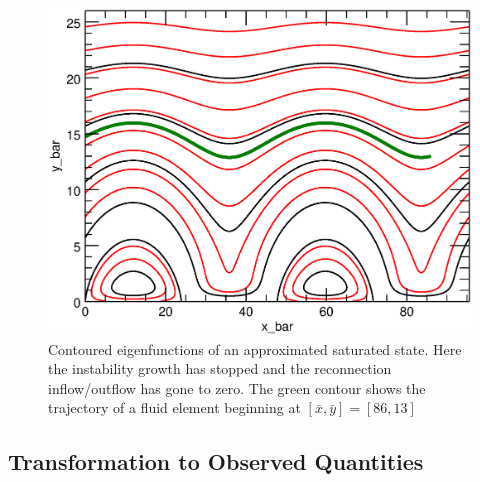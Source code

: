 	\begin{figure}[htbp]  
	
	
	\centerline{\includegraphics[scale=.8]{ParkerLongcope2017/Ref_Response_1a.eps}}
	\caption{Contoured eigenfunctions of an approximated saturated state. Here the instability growth has stopped and the reconnection inflow/outflow has gone to zero. The green contour shows the trajectory of a fluid element beginning at $[\bar{x},\bar{y}]=[86,13]$}
	\label{fig:saturated}
	\end{figure}
	

\subsection{Transformation to Observed Quantities}

